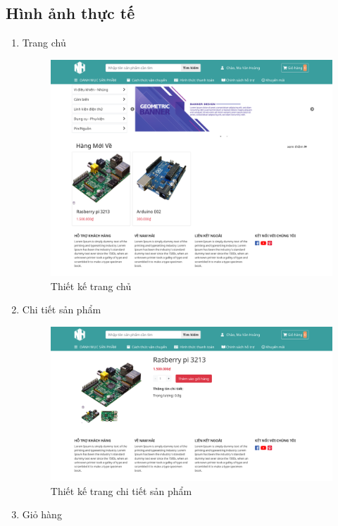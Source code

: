 \begin{enumerate}[label=\textbf{\alph*)}]
\section{Hình ảnh thực tế}
\begin{enumerate}[label=\textbf{\alph*)}]
    \item Trang chủ
    \begin{figure}[h!]
       \centering
        \includegraphics[scale=0.27]{fig/r_home.png}
       \caption{Thiết kế trang chủ}
    \end{figure}
    \item Chi tiết sản phẩm
    \begin{figure}[h!]
       \centering
        \includegraphics[scale=0.27]{fig/r_product_details.png}
       \caption{Thiết kế trang chi tiết sản phẩm}
    \end{figure}
    \newpage
    \item Giỏ hàng

\end{enumerate}
\end{enumerate}
